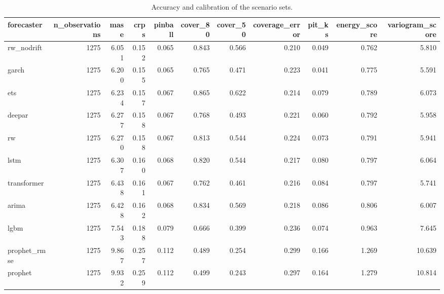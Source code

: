 \begin{table}
\caption{Accuracy and calibration of the scenario sets.}
\label{tab:forecast_quality}
\begin{tabular}{lrrrrrrrrrr}
\toprule
forecaster & n\_observations & mase & crps & pinball & cover\_80 & cover\_50 & coverage\_error & pit\_ks & energy\_score & variogram\_score \\
\midrule
rw\_nodrift & 1275 & 6.051 & 0.152 & 0.065 & 0.843 & 0.566 & 0.210 & 0.049 & 0.762 & 5.810 \\
garch & 1275 & 6.200 & 0.155 & 0.065 & 0.765 & 0.471 & 0.223 & 0.041 & 0.775 & 5.591 \\
ets & 1275 & 6.234 & 0.157 & 0.067 & 0.865 & 0.622 & 0.214 & 0.079 & 0.789 & 6.073 \\
deepar & 1275 & 6.277 & 0.158 & 0.067 & 0.768 & 0.493 & 0.221 & 0.060 & 0.792 & 5.958 \\
rw & 1275 & 6.270 & 0.158 & 0.067 & 0.813 & 0.544 & 0.224 & 0.073 & 0.791 & 5.941 \\
lstm & 1275 & 6.307 & 0.160 & 0.068 & 0.820 & 0.544 & 0.217 & 0.080 & 0.797 & 6.064 \\
transformer & 1275 & 6.438 & 0.161 & 0.067 & 0.762 & 0.461 & 0.216 & 0.084 & 0.797 & 5.741 \\
arima & 1275 & 6.428 & 0.162 & 0.068 & 0.834 & 0.569 & 0.218 & 0.086 & 0.806 & 6.007 \\
lgbm & 1275 & 7.543 & 0.188 & 0.079 & 0.666 & 0.399 & 0.236 & 0.074 & 0.963 & 7.645 \\
prophet\_rmse & 1275 & 9.867 & 0.257 & 0.112 & 0.489 & 0.254 & 0.299 & 0.166 & 1.269 & 10.639 \\
prophet & 1275 & 9.932 & 0.259 & 0.112 & 0.499 & 0.243 & 0.297 & 0.164 & 1.279 & 10.814 \\
\bottomrule
\end{tabular}
\end{table}
